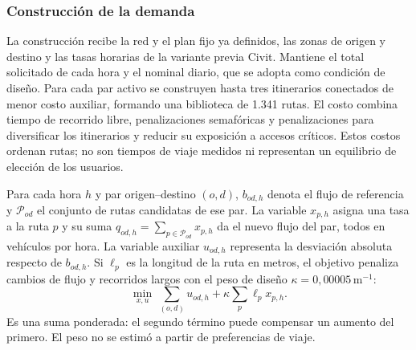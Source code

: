 \subsubsection{Construcción de la demanda}
\label{sec:mendoza_demanda_apendice}

La construcción recibe la red y el plan fijo ya definidos, las zonas de origen y destino y las tasas horarias de la variante previa Civit. Mantiene el total solicitado de cada hora y el nominal diario, que se adopta como condición de diseño. Para cada par activo se construyen hasta tres itinerarios conectados de menor costo auxiliar, formando una biblioteca de 1.341 rutas. El costo combina tiempo de recorrido libre, penalizaciones semafóricas y penalizaciones para diversificar los itinerarios y reducir su exposición a accesos críticos. Estos costos ordenan rutas; no son tiempos de viaje medidos ni representan un equilibrio de elección de los usuarios.

Para cada hora $h$ y par origen--destino $(o,d)$, $b_{od,h}$ denota el flujo de referencia y $\mathcal{P}_{od}$ el conjunto de rutas candidatas de ese par. La variable $x_{p,h}$ asigna una tasa a la ruta $p$ y su suma $q_{od,h}=\sum_{p\in\mathcal{P}_{od}}x_{p,h}$ da el nuevo flujo del par, todos en vehículos por hora. La variable auxiliar $u_{od,h}$ representa la desviación absoluta respecto de $b_{od,h}$. Si $\ell_p$ es la longitud de la ruta en metros, el objetivo penaliza cambios de flujo y recorridos largos con el peso de diseño $\kappa=0{,}00005\,\text{m}^{-1}$:
\begin{equation}
 \min_{x,u}\ \sum_{(o,d)}u_{od,h}
       +\kappa\sum_p\ell_p x_{p,h}.
 \label{eq:mendoza_balance_objetivo}
\end{equation}
Es una suma ponderada: el segundo término puede compensar un aumento del primero. El peso no se estimó a partir de preferencias de viaje.

